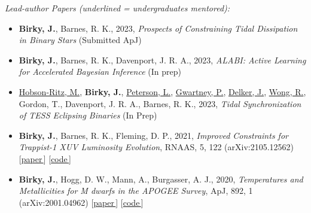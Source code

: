 \documentclass[a4,11pt]{article}
\let\orighref\href
\renewcommand{\href}[2]{\orighref{#1}{#2\,\scriptsize\faExternalLink}}
\begin{document}
\textsl{Lead-author Papers (underlined = undergraduates mentored):} 
\begin{itemize}[itemsep=0pt]
    \item \textbf{Birky, J.}, Barnes, R. K., 2023, \textsl{Prospects of Constraining Tidal Dissipation in Binary Stars} (Submitted ApJ)
    \item \textbf{Birky, J.}, Barnes, R. K., Davenport, J. R. A., 2023, \textsl{ALABI: Active Learning for Accelerated Bayesian Inference} (In prep)
    \item \underline{Hobson-Ritz, M.}, \textbf{Birky, J.}, \underline{Peterson, L.}, \underline{Gwartney, P.}, \underline{Delker, J.}, \underline{Wong, R.}, Gordon, T., Davenport, J. R. A., Barnes, R. K., 2023, \textsl{Tidal Synchronization of TESS Eclipsing Binaries} (In Prep)
    \item \textbf{Birky, J.}, Barnes, R. K., Fleming, D. P., 2021, \textsl{Improved Constraints for Trappist-1 XUV Luminosity Evolution}, RNAAS, 5, 122 (arXiv:2105.12562)  [\href{https://iopscience.iop.org/article/10.3847/2515-5172/ac034c}{paper}] [\href{https://github.com/jbirky/trappist_xuv}{code}]
    \item \textbf{Birky, J.}, Hogg, D. W., Mann, A., Burgasser, A. J., 2020, \textsl{Temperatures and Metallicities for M dwarfs in the APOGEE Survey}, ApJ, 892, 1 (arXiv:2001.04962) [\href{https://iopscience.iop.org/article/10.3847/1538-4357/ab7004}{paper}] [\href{https://github.com/jbirky/Mdwarf_project}{code}]
\end{itemize}
\end{document}
